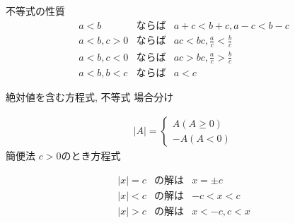 \documentclass[aspectratio=169, 12pt]{beamer} %
\begin{document}
\begin{frame}{不等式の性質}
    \begin{eqnarray*}
        a<b&ならば&a+c<b+c, a-c<b-c \\
        a<b, c>0&ならば&ac<bc, \frac{a}{c}<\frac{b}{c} \\
        a<b, c<0&ならば&ac>bc, \frac{a}{c}>\frac{b}{c} \\
        a<b, b<c&ならば&a<c
    \end{eqnarray*}
\end{frame}
\begin{frame}{絶対値を含む方程式, 不等式}
    場合分け\par
    \begin{eqnarray*}
        |A|=
        \begin{cases}
            A (A\geq 0) \\
            -A (A < 0)
        \end{cases}
    \end{eqnarray*}
    簡便法 $c>0$のとき方程式 \par
    \begin{eqnarray*}
        |x|=c&の解は&x=\pm c \\
        |x|<c&の解は&-c<x<c \\
        |x|>c&の解は&x<-c, c<x
    \end{eqnarray*}
\end{frame}
\end{document}
